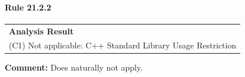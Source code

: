\paragraph{Rule 21.2.2}
\begin{longtable}{p{13cm}}
\textbf{Analysis Result} \\
(C1) Not applicable: C++ Standard Library Usage Restriction \\
\end{longtable}
\textbf{Comment:} Does naturally not apply. \\
